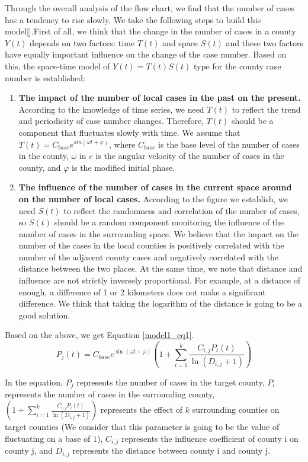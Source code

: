 \documentclass{mcmthesis}
\begin{document}
Through the overall analysis of the flow chart, we find that the number of cases has a tendency to rise slowly. We take the following steps to build this model[\cite{4}].First of all, we think that the change in the number of cases in a county $Y(t)$ depends on two factors: time $T(t)$ and space $S(t)$ and these two factors have equally important influence on the change of the case number. Based on this, the space-time model of $Y(t) = T(t)S(t)$ type for the county case number is established:
\begin{enumerate}
	\item \textbf{The impact of the number of local cases in the past on the present.} According to the knowledge of time series, we need $T(t)$ to reflect the trend and periodicity of case number changes. Therefore, $T(t)$ should be a component that fluctuates slowly with time. We assume that $ T(t) = C_{base}e^{sin(\omega t+\varphi)}$, where $C_{base}$ is the base level of the number of cases in the county, $\omega$ in $e$ is the angular velocity of the number of cases in the county, and $\varphi$ is the modified initial phase.
	\item \textbf{The influence of the number of cases in the current space around on the number of local cases.} According to the figure we establish, we need $S(t)$ to reflect the randomness and correlation of the number of cases, so $S(t)$ should be a random component monitoring the influence of the number of cases in the surrounding space. We believe that the impact on the number of the cases in the local counties is positively correlated with the number of the adjacent county cases and negatively correlated with the distance between the two places. At the same time, we note that distance and influence are not strictly inversely proportional. For example, at a distance of enough, a difference of 1 or 2 kilometers does not make a significant difference. We think that taking the logarithm of the distance is going to be a good solution.
\end{enumerate} 

Based on the above, we get Equation \eqref{model1_eq1}.
\begin{equation}
P_{j}(t) = C_{base} e^{\sin (\omega t+\varphi)} (1+\sum_{i=1}^{k} {\frac{C_{i,j} P_{i}(t)}{\ln (D_{i,j}+1)}})
\label{model1_eq1}
\end{equation}

In the equation, $P_{j}$ represents the number of cases in the target county, $P_{i}$ represents the number of cases in the surrounding county, $(1+\sum_{i=1}^{k} {\frac{C_{i,j} P_{i}(t)}{\ln (D_{i,j}+1)}})$ represents the effect of $k$ surrounding counties on target counties (We consider that this parameter is going to be the value of fluctuating on a base of $1$), $C_{i,j}$ represents the influence coefficient of county i on county j, and $D_{i,j}$ represents the distance between county i and county j.
\end{document}
